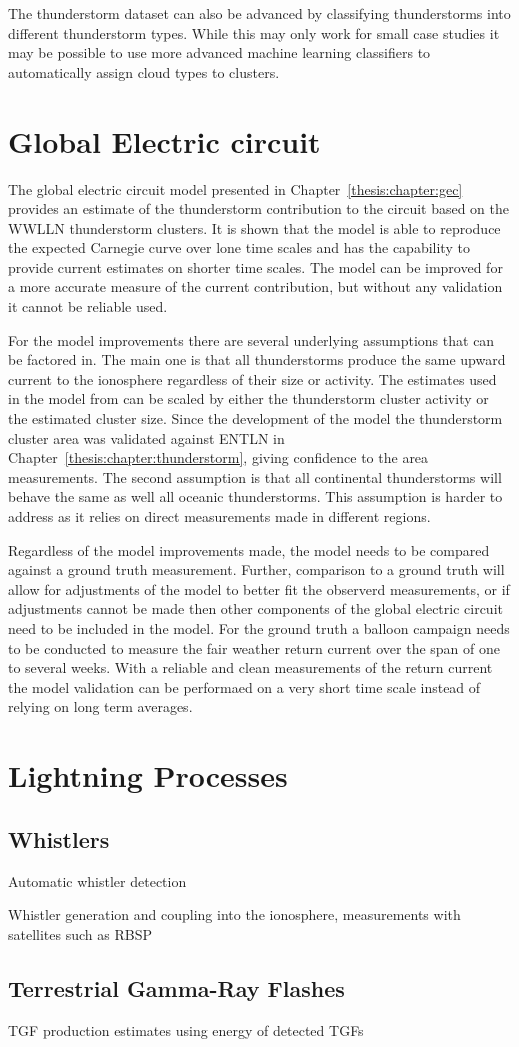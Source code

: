 The thunderstorm dataset can also be advanced by classifying thunderstorms into different thunderstorm types.
While this may only work for small case studies it may be possible to use more advanced machine learning classifiers to automatically assign cloud types to clusters.

\section{Global Electric circuit}

The global electric circuit model presented in Chapter~\ref{thesis:chapter:gec} provides an estimate of the thunderstorm contribution to the circuit based on the WWLLN thunderstorm clusters.
It is shown that the model is able to reproduce the expected Carnegie curve over lone time scales and has the capability to provide current estimates on shorter time scales.
The model can be improved for a more accurate measure of the current contribution, but without any validation it cannot be reliable used.

For the model improvements there are several underlying assumptions that can be factored in.
The main one is that all thunderstorms produce the same upward current to the ionosphere regardless of their size or activity.
The estimates used in the model from \citep{Mach2010} can be scaled by either the thunderstorm cluster activity or the estimated cluster size.
Since the development of the model the thunderstorm cluster area was validated against ENTLN in Chapter~\ref{thesis:chapter:thunderstorm}, giving confidence to the area measurements.
The second assumption is that all continental thunderstorms will behave the same as well all oceanic thunderstorms.
This assumption is harder to address as it relies on direct measurements made in different regions.

Regardless of the model improvements made, the model needs to be compared against a ground truth measurement.
Further, comparison to a ground truth will allow for adjustments of the model to better fit the observerd measurements, or if adjustments cannot be made then other components of the global electric circuit need to be included in the model.
For the ground truth a balloon campaign needs to be conducted to measure the fair weather return current over the span of one to several weeks.
With a reliable and clean measurements of the return current the model validation can be performaed on a very short time scale instead of relying on long term averages.

\section{Lightning Processes}

\subsection{Whistlers}

  Automatic whistler detection

Whistler generation and coupling into the ionosphere, measurements with satellites such as RBSP

\subsection{Terrestrial Gamma-Ray Flashes}

 TGF production estimates using energy of detected TGFs





